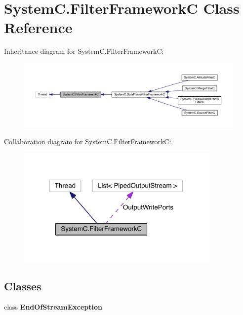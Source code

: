 \hypertarget{class_system_c_1_1_filter_framework_c}{}\section{System\+C.\+Filter\+Framework\+C Class Reference}
\label{class_system_c_1_1_filter_framework_c}


Inheritance diagram for System\+C.\+Filter\+Framework\+C\+:
\nopagebreak
\begin{figure}[H]
\begin{center}
\leavevmode
\includegraphics[width=350pt]{class_system_c_1_1_filter_framework_c__inherit__graph}
\end{center}
\end{figure}


Collaboration diagram for System\+C.\+Filter\+Framework\+C\+:
\nopagebreak
\begin{figure}[H]
\begin{center}
\leavevmode
\includegraphics[width=281pt]{class_system_c_1_1_filter_framework_c__coll__graph}
\end{center}
\end{figure}
\subsection*{Classes}
\begin{DoxyCompactItemize}
\item 
class {\bfseries End\+Of\+Stream\+Exception}
\end{DoxyCompactItemize}
